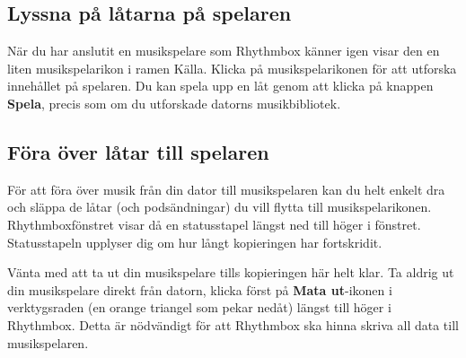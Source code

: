 \documentclass[a4paper,final]{memoir} %
\begin{document}
\subsection{Lyssna på låtarna på spelaren}

När du har anslutit en musikspelare som Rhythmbox känner igen visar den en liten musikspelarikon i ramen Källa. Klicka på musikspelarikonen för att utforska innehållet på spelaren. Du kan spela upp en låt genom att klicka på knappen \textbf{Spela}, precis som om du utforskade datorns musikbibliotek.


\subsection{Föra över låtar till spelaren}\label{ipod}

För att föra över musik från din dator till musikspelaren kan du helt enkelt dra och släppa de låtar (och podsändningar) du vill flytta till musikspelarikonen. Rhythmboxfönstret visar då en statusstapel längst ned till höger i fönstret. Statusstapeln upplyser dig om hur långt kopieringen har fortskridit.

Vänta med att ta ut din musikspelare tills kopieringen här helt klar. Ta aldrig ut din musikspelare direkt från datorn, klicka först på \textbf{Mata ut}-ikonen i verktygsraden (en orange triangel som pekar nedåt) längst till höger i Rhythmbox. Detta är nödvändigt för att Rhythmbox ska hinna skriva all data till musikspelaren.


\end{document}
